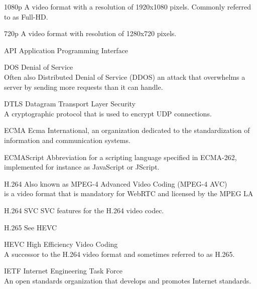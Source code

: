 \documentclass[../thesis.tex]{subfiles}
\begin{document}

\makeatletter
\newcommand{\tocfill}{\cleaders\hbox{$\m@th \mkern\@dotsep mu . \mkern\@dotsep mu$}\hfill}
\makeatother
\newcommand{\abbrlabel}[1]{\makebox[3cm][l]{\textbf{#1}\ \tocfill}}
\newenvironment{abbreviations}{\begin{list}{}{\renewcommand{\makelabel}{\abbrlabel}%
        \setlength{\labelwidth}{3cm}\setlength{\leftmargin}{\labelwidth+\labelsep}%
                                              \setlength{\itemsep}{0pt}}}{\end{list}}

\begin{abbreviations}
\item[1080p] A video format with a resolution of 1920x1080 pixels. Commonly referred to as Full-HD.
\item[720p] A video format with resolution of 1280x720 pixels.
\item[API] Application Programming Interface
\item[DOS] Denial of Service \\Often also Distributed Denial of Service (DDOS) an attack that overwhelms a server by sending more requests than it can handle.
\item[DTLS] Datagram Transport Layer Security \\A cryptographic protocol that is used to encrypt UDP connections.
\item[ECMA] Ecma International, an organization dedicated to the standardization of information and communication systems.
\item[ECMAScript] Abbreviation for a scripting language specified in ECMA-262, implemented for instance as JavaScript or JScript.
\item[H.264] Also known as MPEG-4 Advanced Video Coding (MPEG-4 AVC)\\is a video format that is mandatory for WebRTC and licensed by the MPEG LA
\item[H.264 SVC] SVC features for the H.264 video codec.
\item[H.265] See HEVC
\item[HEVC] High Efficiency Video Coding \\A successor to the H.264 video format and sometimes referred to as H.265.
\item[IETF] Internet Engineering Task Force \\An open standards organization that develops and promotes Internet standards.

\end{abbreviations}
\end{document}
